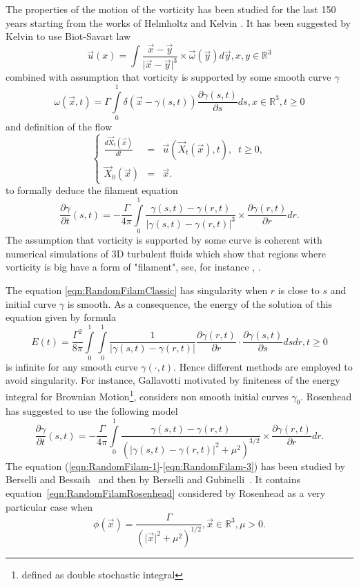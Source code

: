\documentclass[11pt,a4paper,leqno]{amsart}%
\theoremstyle{plain}
\theoremstyle{remark}
\theoremstyle{plain}
\numberwithin{equation}{section}
\begin{document}
The properties of the motion of the vorticity has been studied for the last 150 years starting from the works of
Helmholtz \cite{Helm1858} and Kelvin \cite{Kelvin1869}. It has been suggested by Kelvin  to use Biot-Savart law
\[
\vec{u}(x)=\int\frac{\vec{x}-\vec{y}}{\vert \vec{x}-\vec{y}\vert^3}\times\vec{\omega}(\vec{y})d\vec{y},x,y\in\mathbb{R}^3
\]
combined with assumption that vorticity is supported by some smooth curve $\gamma$
\[
\omega(\vec{x},t)=\Gamma\int\limits_0^1\delta(\vec{x}-\gamma(s,t))\frac{\partial \gamma(s,t)}{\partial s}ds,x\in\mathbb{R}^3,t\geq 0
\]
and definition of the flow
\begin{equation}\label{equa21}
\left\{
\begin{array}{rcl}
\frac{d \vec{X}_t(\vec{x})}{dt}&=&\vec{u}(\vec{X}_t(\vec{x}),t),\;\;t\geq 0,\\
\vec{X}_0(\vec{x})&=&\vec{x}.
\end{array}
\right.
\end{equation}
to formally deduce the filament equation
\begin{equation}\label{eqn:RandomFilamClassic}
\frac{\partial \gamma}{\partial t}(s,t)=-\frac{\Gamma}{4\pi}\int\limits_0^1\frac{\gamma(s,t)-\gamma(r,t)}{\vert \gamma(s,t)-\gamma(r,t)\vert^3}\times\frac{\partial\gamma(r,t)}{\partial r}dr.
\end{equation}
The assumption that vorticity is supported by some curve is coherent with numerical simulations of 3D turbulent fluids
which show that regions where vorticity is big have a form of
"filament", see, for instance \cite{[Bell+Markus_1992]},
\cite{[VincMeneguzzi-1991]}.

The equation \eqref{eqn:RandomFilamClassic} has singularity when $r$ is close to $s$ and initial curve $\gamma$ is smooth.
As a consequence, the energy of the solution of this equation given by formula
\[
E(t)=\frac{\Gamma^2}{8\pi}\int\limits_0^1\int\limits_0^1\frac{1}{\vert \gamma(s,t)-\gamma(r,t)\vert }\frac{\partial \gamma(r,t)}{\partial r}\cdot\frac{\partial \gamma(s,t)}{\partial s}dsdr,t\geq 0
\]
is infinite for any smooth curve $\gamma(\cdot,t)$.
Hence different methods are employed to avoid singularity. For instance, Gallavotti \cite{Gallavotti} motivated by finiteness of the energy integral
for Brownian Motion\footnote{defined as double stochastic integral},
considers non smooth initial curves $\gamma_0$.
Rosenhead \cite{[Rosenhead-1930]}  has suggested to use the following model
\begin{equation}\label{eqn:RandomFilamRosenhead}
\frac{\partial \gamma}{\partial t}(s,t)=-\frac{\Gamma}{4\pi}\int\limits_0^1\frac{\gamma(s,t)-\gamma(r,t)}{(\vert \gamma(s,t)-\gamma(r,t)\vert^2+\mu^2)^{3/2}}\times\frac{\partial\gamma(r,t)}{\partial r}dr.
\end{equation}
The equation (\eqref{eqn:RandomFilam-1}-\eqref{eqn:RandomFilam-3}) has been studied  by Berselli and Bessaih~\cite{[Bers+Bess_2002]} and then by Berselli and Gubinelli~\cite{[Bers+Gub_2007]}.
It contains equation~\eqref{eqn:RandomFilamRosenhead} considered by Rosenhead as a very particular case when
\[
\phi(\vec{x})=\frac{\Gamma}{(\vert \vec{x}\vert^2+\mu^2)^{1/2}},\vec{x}\in\mathbb{R}^3,\mu>0.
\]
\end{document}
